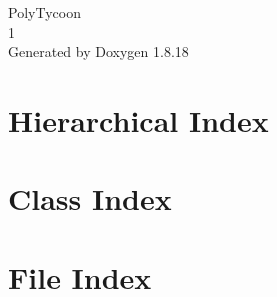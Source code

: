 \let\mypdfximage\pdfximage\def\pdfximage{\immediate\mypdfximage}\documentclass[twoside]{book}
\newcommand{\+}{\discretionary{\mbox{\scriptsize$\hookleftarrow$}}{}{}}
\newcommand{\clearemptydoublepage}{%
  \newpage{\pagestyle{empty}\cleardoublepage}%
}
\begin{document}
\begin{titlepage}
\vspace*{7cm}
\begin{center}%
{\Large Poly\+Tycoon \\[1ex]\large 1 }\\
\vspace*{1cm}
{\large Generated by Doxygen 1.8.18}\\
\end{center}
\end{titlepage}
\clearemptydoublepage
{}
\tableofcontents
\clearemptydoublepage
{}

\chapter{Hierarchical Index}

\chapter{Class Index}

\chapter{File Index}

\end{document}
